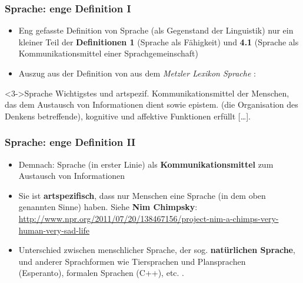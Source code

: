 
\begin{frame}
\frametitle{Sprache: enge Definition I}

\begin{itemize}
	\item<1-> Eng gefasste Definition von Sprache (als Gegenstand der Linguistik) \ras nur ein kleiner Teil der \textbf{Definitionen 1} (Sprache als Fähigkeit) und \textbf{4.1} (Sprache als Kommunikationsmittel einer Sprachgemeinschaft)
	\item<2-> Auszug aus der Definition von  aus dem \textit{Metzler Lexikon Sprache} \citep{Glueck&Roedel16a}:
\end{itemize}
			
\begin{block}<3->{Sprache}
    	   Wichtigstes und artspezif. Kommunikationsmittel der Menschen, das dem Austausch von Informationen dient sowie epistem. (die Organisation des Denkens betreffende), kognitive und affektive Funktionen erfüllt {[}\ldots].
\end{block}
	
\end{frame}


\begin{frame}
\frametitle{Sprache: enge Definition II}

\begin{itemize}
	\item<1-> Demnach: Sprache (in erster Linie) als \textbf{Kommunikationsmittel} zum Austausch von Informationen
	\medskip
	\item<2-> Sie ist \textbf{artspezifisch}, \dash dass nur Menschen eine Sprache (in dem
          oben genannten Sinne) haben.
          \medskip
	Siehe \textbf{Nim Chimpsky}:\\
	\url{http://www.npr.org/2011/07/20/138467156/project-nim-a-chimps-very-human-very-sad-life}
	\medskip
	\item<3-> Unterschied zwischen menschlicher Sprache, \dash der sog. \textbf{natürlichen
          Sprache}, und anderer Sprachformen wie Tiersprachen und Plansprachen\\
 (\zb Esperanto), formalen Sprachen (\zb C++), etc. \citep[vgl.][]{Thuemmel00a}.\
\end{itemize}		

\nocite{Bussmann83a-removed}
\end{frame}


